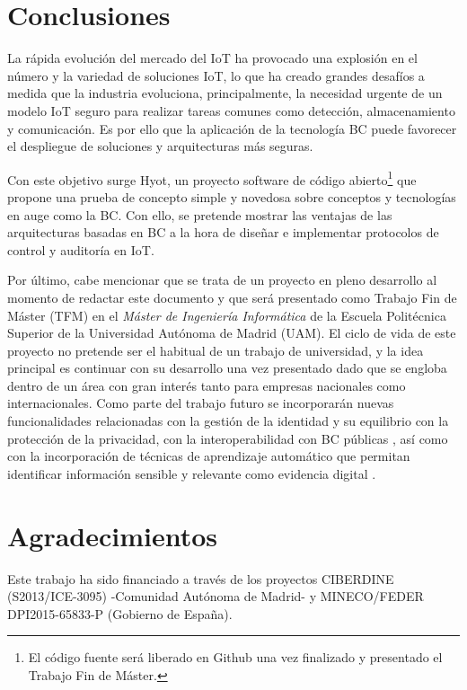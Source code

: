 \documentclass[10pt,conference,a4paper]{IEEEtran}
\begin{document}
\section{Conclusiones}

La rápida evolución del mercado del IoT ha provocado una explosión en
el número y la variedad de soluciones IoT, lo que ha creado grandes
desafíos a medida que la industria evoluciona, principalmente, la
necesidad urgente de un modelo IoT seguro para realizar tareas comunes
como detección, almacenamiento y comunicación. Es por ello que la
aplicación de la tecnología BC puede favorecer el despliegue de
soluciones y arquitecturas más seguras.

Con este objetivo surge Hyot, un proyecto software de código
abierto\footnote{El código fuente será liberado en Github una vez
  finalizado y presentado el Trabajo Fin de Máster.} que propone una
prueba de concepto simple y novedosa sobre conceptos y tecnologías en
auge como la BC. Con ello, se pretende mostrar las ventajas de las
arquitecturas basadas en BC a la hora de diseñar e implementar
protocolos de control y auditoría en IoT.

Por último, cabe mencionar que se trata de un proyecto en pleno
desarrollo al momento de redactar este documento y que será presentado
como Trabajo Fin de Máster (TFM) en el \textit{Máster de Ingeniería
  Informática} de la Escuela Politécnica Superior de la Universidad
Autónoma de Madrid (UAM). El ciclo de vida de este proyecto no pretende ser el
habitual de un trabajo de universidad, y la idea principal es continuar
con su desarrollo una vez presentado dado que se engloba dentro de un
área con  gran interés tanto para empresas nacionales como
internacionales. Como parte del trabajo futuro se incorporarán nuevas
funcionalidades relacionadas con la gestión de la identidad y su
equilibrio con la protección de la privacidad\cite{jira:IM:FAB-2005}, con la interoperabilidad con BC
públicas \cite{sawtooth:url,ronghua:2018:BCAC}, así como con la incorporación de técnicas de
aprendizaje automático  que permitan identificar información sensible
y relevante como evidencia digital \cite{ramachandran:2018:SmartProvenance}. 
 
\section*{Agradecimientos}

Este trabajo ha sido financiado a través de los proyectos
CIBERDINE (S2013/ICE-3095) -Comunidad Autónoma de Madrid- y
MINECO/FEDER DPI2015-65833-P (Gobierno de España).
\end{document}
